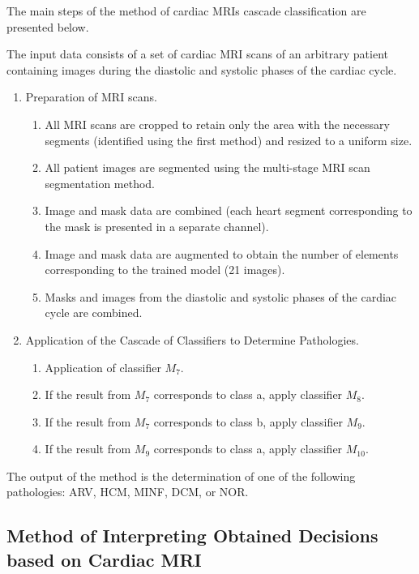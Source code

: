 \documentclass[fleqn,10pt]{wlscirep}
\begin{document}
The main steps of the method of cardiac MRIs cascade classification are presented below.

The input data consists of a set of cardiac MRI scans of an arbitrary patient containing images during the diastolic and systolic phases of the cardiac cycle.

\begin{enumerate}[label=Step \arabic*:, leftmargin=5em]
    \item Preparation of MRI scans.
    \begin{enumerate}[label=Step 1.\arabic*:, leftmargin=2.5em]
        \item All MRI scans are cropped to retain only the area with the necessary segments (identified using the first method) and resized to a uniform size.
        \item All patient images are segmented using the multi-stage MRI scan segmentation method.
        \item Image and mask data are combined (each heart segment corresponding to the mask is presented in a separate channel).
        \item Image and mask data are augmented to obtain the number of elements corresponding to the trained model (21 images).
        \item Masks and images from the diastolic and systolic phases of the cardiac cycle are combined.
    \end{enumerate}
    \item Application of the Cascade of Classifiers to Determine Pathologies.
    \begin{enumerate}[label=Step 2.\arabic*:, leftmargin=2.5em]
        \item Application of classifier \({M_7}\).
        \item If the result from \({M_7}\) corresponds to class a, apply classifier \({M_8}\).
        \item If the result from \({M_7}\) corresponds to class b, apply classifier \({M_9}\).
        \item If the result from \({M_9}\) corresponds to class a, apply classifier \({M_{10}}\).
    \end{enumerate}
\end{enumerate}

The output of the method is the determination of one of the following pathologies: ARV, HCM, MINF, DCM, or NOR.

\subsection*{Method of Interpreting Obtained Decisions based on Cardiac MRI}
\end{document}

